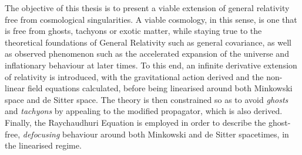 

\begin{abstracts}        %
The objective of this thesis is to present a viable extension of general relativity free from cosmological singularities. A viable cosmology, in this sense, is one that is free from ghosts, tachyons or exotic matter, while staying true to the theoretical foundations of General Relativity such as general covariance, as well as observed phenomenon such as the accelerated expansion of the universe and inflationary behaviour at later times. To this end, an infinite derivative extension of relativity is introduced, with the gravitational action derived and the non-linear field equations calculated, before being linearised around both Minkowski space and de Sitter space. The theory is then constrained so as to avoid \emph{ghosts} and \emph{tachyons} by appealing to the modified propagator, which is also derived. Finally, the Raychaudhuri Equation is employed in order to describe the ghost-free, \emph{defocusing} behaviour around both  Minkowski and de Sitter spacetimes, in the linearised regime.
\end{abstracts}



